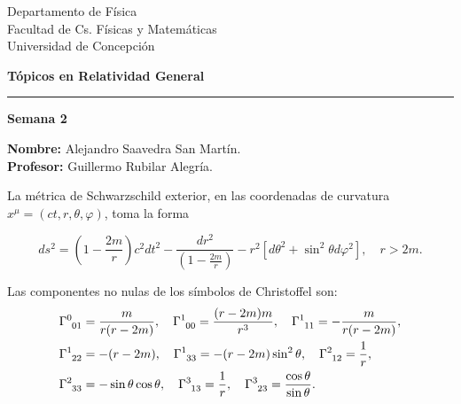 \documentclass[letterpaper,11pt]{article}
\begin{document}
\pagestyle{plain}

\begin{flushleft}\vspace{-2cm}
Departamento de Física \\
Facultad de Cs. Físicas y Matemáticas\\
Universidad de Concepción
\end{flushleft}

\begin{flushright}\vspace{-1.5cm}
\textbf{Tópicos en Relatividad General} 
\end{flushright}

\rule{\linewidth}{0.1mm}

\begin{center}
\textbf{\LARGE Semana 2}
\end{center}

\begin{flushleft}
\textbf{Nombre:} Alejandro Saavedra San Martín. \\
\textbf{Profesor:} Guillermo Rubilar Alegría.
\end{flushleft}

La métrica de Schwarzschild exterior, en las coordenadas de curvatura $x^{\mu} = (ct,r,\theta,\varphi)$, toma la forma
\begin{shaded}
\begin{equation} \label{eq:Scwarzschild-metric}
    ds^2 = \left( 1 - \frac{2m}{r}\right) c^2 dt^2 - \frac{dr^2}{\left( 1- \frac{2m}{r} \right)} - r^2 \left[ d\theta^2 + \sin^2 \theta d\varphi^2 \right], \quad r > 2m.
\end{equation}
    
\end{shaded}

Las componentes no nulas de los símbolos de Christoffel son:
\begin{align}
    \Gamma\indices{^0_{01}} &= \frac{m}{r(r-2m)}, \quad \Gamma\indices{^1_{00}} = \frac{(r-2m)m}{r^3}, \quad \Gamma\indices{^1_{11}} = - \frac{m}{r(r-2m)}, \\
    \Gamma\indices{^1_{22}} &= - (r-2m), \quad \Gamma\indices{^1_{33}} = - (r-2m) \sin^2\theta, \quad \Gamma\indices{^2_{12}} = \frac{1}{r}, \\
    \Gamma\indices{^2_{33}} &= - \sin\theta \cos\theta, \quad \Gamma\indices{^3_{13}} = \frac{1}{r}, \quad \Gamma\indices{^3_{23}} = \frac{\cos\theta}{\sin\theta}.   
\end{align}
\end{document}
